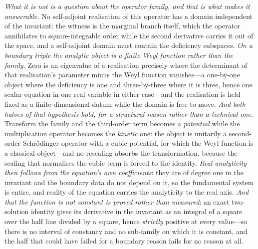 \documentclass[11pt,a4paper]{article}
\theoremstyle{plain}
\theoremstyle{definition}
\theoremstyle{remark}
\begin{document}
\emph{What it is not is a question about the operator family, and that is what makes it answerable.} No
self-adjoint realisation of this operator has a domain independent of the invariant: the witness is the
marginal branch itself, which the operator annihilates to square-integrable order while the second derivative
carries it out of the space, and a self-adjoint domain must contain the deficiency subspaces. \emph{On a
boundary triple the analytic object is a finite Weyl function rather than the family.} Zero is an eigenvalue
of a realisation precisely where the determinant of that realisation's parameter minus the Weyl function
vanishes---a one-by-one object where the deficiency is one and three-by-three where it is three, hence one
scalar equation in one real variable in either case---and the realisation is held fixed as a
finite-dimensional datum while the domain is free to
move.
\emph{And both halves of that hypothesis hold, for a structural reason rather than a technical one.}
Transform the family and the third-order term becomes a \emph{potential} while the multiplication operator
becomes the \emph{kinetic} one: the object is unitarily a second-order Schr\"odinger operator with a cubic
potential, for which the Weyl function is a classical object---and no rescaling absorbs the transformation,
because the scaling that normalises the cubic term is forced to the identity. \emph{Real-analyticity then
follows from the equation's own coefficients}: they are of degree one in the invariant and the boundary data
do not depend on it, so the fundamental system is entire, and reality of the equation carries the
analyticity to the real axis. \emph{And that the function is not constant is proved rather than measured}:
an exact two-solution identity gives its derivative in the invariant as an integral of a square over the
half line divided by a square, hence \emph{strictly} positive at every value---so there is no interval of
constancy and no sub-family on which it is constant, and the half that could have failed for a boundary
reason fails for no reason at
all.
\end{document}
